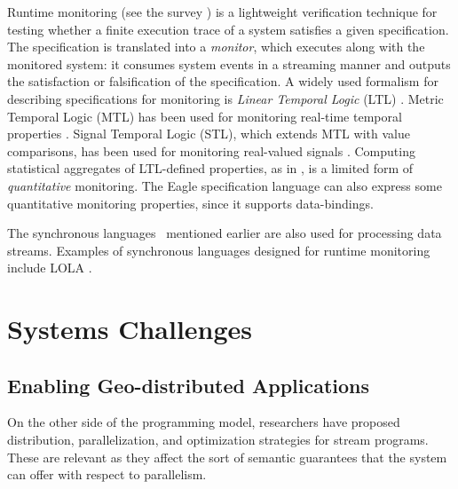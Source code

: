 Runtime monitoring (see the survey \cite{LS2009RV}) is a lightweight verification technique for testing whether a finite execution trace of a system satisfies a given specification. The specification is translated into a \emph{monitor}, which executes along with the monitored system: it consumes system events in a streaming manner and outputs the satisfaction or falsification of the specification. A widely used formalism for describing specifications for monitoring is \emph{Linear Temporal Logic} (LTL) \cite{havelund2004efficient}. Metric Temporal Logic (MTL) has been used for monitoring real-time temporal properties \cite{TR2005MTL}. Signal Temporal Logic (STL), which extends MTL with value comparisons, has been used for monitoring real-valued signals \cite{DDGJJS2017}.
Computing statistical aggregates of LTL-defined properties, as in \cite{finkbeiner2002collecting}, is a limited form of \emph{quantitative} monitoring.
The Eagle specification language \cite{barringer2004rule} can also express some quantitative monitoring properties, since it supports data-bindings.

The synchronous languages~\cite{BCEHlGdS2003SL} mentioned earlier are also used for processing data streams.
Examples of synchronous languages designed for runtime monitoring include LOLA \cite{d2005lola,bozzelli2016foundations}.



\section{Systems Challenges}

\subsection{Enabling Geo-distributed Applications}

On the other side of the programming model,
researchers have proposed distribution, parallelization, and optimization strategies for stream programs.
These are relevant as they affect the sort of semantic guarantees that the system can offer with respect to parallelism.

